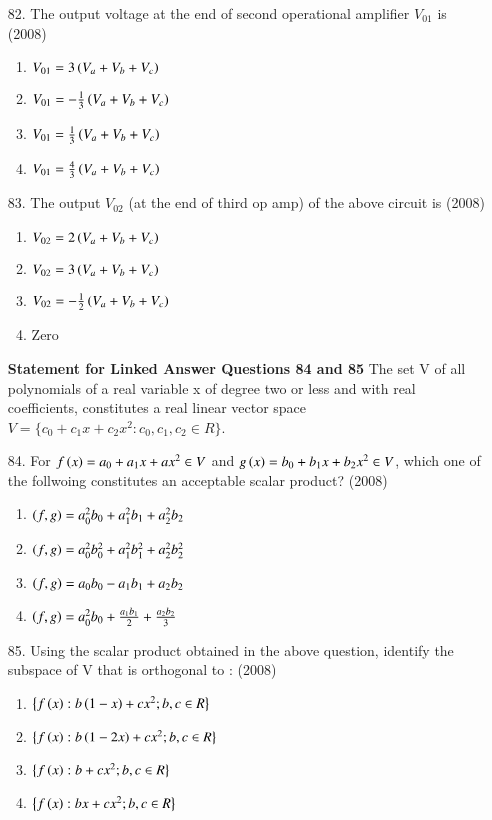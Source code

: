 \documentclass[journal]{IEEEtran}
\begin{document}
\begin{enumerate}
    \item[82.] The output voltage at the end of second operational amplifier $V_{01}$ is \hfill (2008)
    \begin{enumerate}[label=(\Alph*)]
        \item $V_{01}=3\left(V_a+V_b+V_c\right)$
        \item $V_{01}=-\frac{1}{3}\left(V_a+V_b+V_c\right)$
        \item $V_{01}=\frac{1}{3}\left(V_a+V_b+V_c\right)$
        \item $V_{01}=\frac{4}{3}\left(V_a+V_b+V_c\right)$
    \end{enumerate}
    \item[83.] The output $V_{02}$ (at the end of third op amp) of the above circuit is \hfill (2008)
    \begin{enumerate}[label=(\Alph*)]
        \item $V_{02}=2\left(V_a+V_b+V_c\right)$
        \item $V_{02}=3\left(V_a+V_b+V_c\right)$
        \item $V_{02}=-\frac{1}{2}\left(V_a+V_b+V_c\right)$
        \item Zero
    \end{enumerate}
    \textbf{Statement for Linked Answer Questions 84 and 85}
    The set V of all polynomials of a real variable x of degree two or less and with real coefficients, constitutes a real linear vector space $V=\{c_0 + c_1x + c_2 x^2 : c_0, c_1, c_2 \in R\}$.
    \item [84.] For $f \left(x\right) = a_0 + a_1x + ax^2 \in V$ and $g\left(x\right)=b_0+b_1x+b_2x^2 \in V$, which one of the follwoing constitutes an acceptable scalar product? \hfill (2008)
    \begin{enumerate}[label=(\Alph*)]
        \item $\left(f,g\right) = a_0^2b_0+a_1^2b_1+a_2^2b_2$
        \item $\left(f,g\right) = a_0^2b_0^2+a_1^2b_1^2+a_2^2b_2^2$
        \item $\left(f,g\right) = a_0b_0-a_1b_1+a_2b_2$
        \item $\left(f,g\right) = a_0^2b_0+\frac{a_1b_1}{2}+\frac{a_2b_2}{3}$
    \end{enumerate}
    \item[85.] Using the scalar product obtained in the above question, identify the subspace of V that is orthogonal to : \hfill (2008)
    \begin{enumerate}[label=(\Alph*)]
        \item $\bigl\{f\left(x\right):b\left(1-x\right)+cx^2;b,c\in R\bigr\}$
        \item  $\bigl\{f\left(x\right):b\left(1-2x\right)+cx^2;b,c\in R\bigr\}$
        \item  $\bigl\{f\left(x\right):b+cx^2;b,c\in R\bigr\}$
        \item  $\bigl\{f\left(x\right):bx+cx^2;b,c\in R\bigr\}$
    \end{enumerate}
\end{enumerate}
\end{document}
